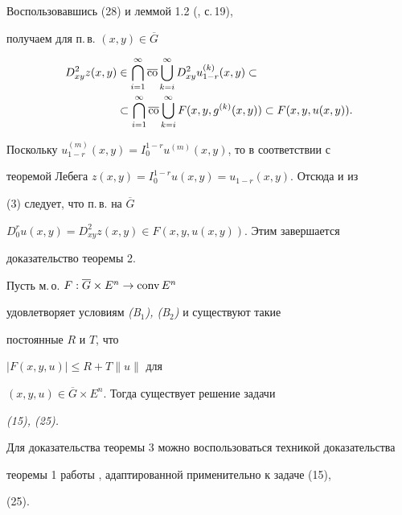 \begin{pf}
Воспользовавшись (28) и леммой 1.2 (\cite{Sos}, с.\,19), 


получаем для п.\,в. $(x,y)\in\overline G$ 


\begin{align*} 


D^2_{xy}z(x,y)&\in\bigcap\limits_{i=1}^\infty\overline{\co} 


\bigcup\limits_{k=i}^\infty D^2_{xy}u^{(k)}_{1-r}(x,y)\subset\\ 


% 


&\subset\bigcap\limits_{i=1}^\infty\overline{\co} 


\bigcup\limits_{k=i}^\infty F(x,y,g^{(k)}(x,y))\subset 


F(x,y,u(x,y)). 


\end{align*} 


Поскольку $u^{(m)}_{1-r}(x,y)=I_0^{1-r}u^{(m)}(x,y)$, то в соответствии с 


теоремой Лебега $z(x,y)=I_0^{1-r}u(x,y)=u_{1-r}(x,y)$. Отсюда и из 


(3) следует, что п.\,в. на $\overline G\;$ 


$D_0^ru(x,y)=D^2_{xy}z(x,y)\in F(x,y,u(x,y))$. Этим завершается 


доказательство теоремы 2. 


\end{pf} 


 


\begin{thm} Пусть м.\,о. $F:\overline G\times E^n\to\operatorname{conv} E^n$ 


удовлетворяет условиям {\em (B${}_1$), (B${}_2$)} и существуют такие 


постоянные $R$ и $T$, что 


$|F(x,y,u)|\le R+T\|u\|$ для 


$(x,y,u)\in\overline G\times E^n$. Тогда существует решение задачи 


{\em (15), (25).} 


\end{thm} 


 


Для доказательства теоремы 3 можно воспользоваться техникой доказательства 


теоремы 1 работы \cite{Bul}, адаптированной применительно к задаче (15), 


(25). 


